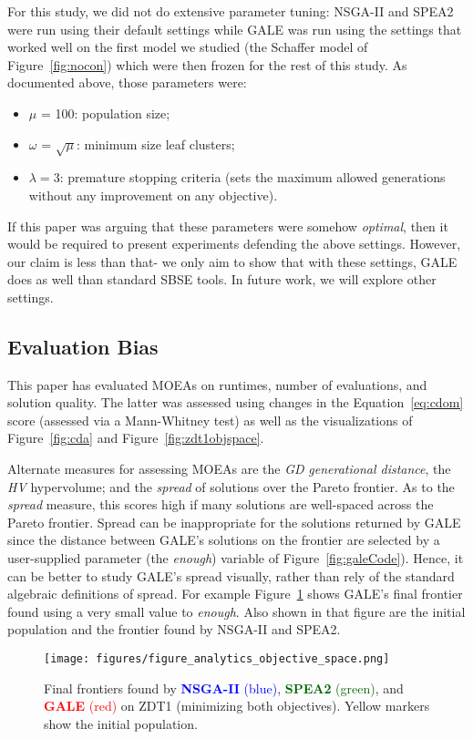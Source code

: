 \documentclass[10pt,journal,compsoc]{IEEEtran}
\newcommand{\eq}[1]{Equation~\ref{eq:#1}}
\newcommand{\bi}{\begin{itemize}}
\newcommand{\ei}{\end{itemize}}
\newcommand{\fig}[1]{Figure~\ref{fig:#1}}
\begin{document}
For this study, we did not do extensive parameter tuning:
NSGA-II and SPEA2 were run using their default settings
while GALE was run using the settings that worked well on the first model  we
studied (the Schaffer model of \fig{nocon}) which were then frozen for the
rest of this study. As documented above, those parameters were:
\bi
\item $\mu$ = 100:  population size;
\item $\omega$ = $\sqrt{\mu}$: minimum size leaf clusters;
\item $\lambda = 3$: premature stopping criteria (sets the
maximum allowed 
generations without
any improvement on any objective).
\ei
If this paper was arguing that these parameters were somehow {\em optimal},
then it would be required to present experiments defending the above settings.
However, our  claim is less than that- we only aim  to show
that with these settings, GALE does as well than standard
SBSE tools. In future work, we will explore other  settings.

\subsection{Evaluation Bias}
This paper has evaluated MOEAs on runtimes,
number of evaluations,
and solution quality. The latter was assessed
using changes in the \eq{cdom} score (assessed via a Mann-Whitney
test) as well as the visualizations of \fig{cda}
and \fig{zdt1objspace}.






Alternate measures for assessing MOEAs are the
{\em GD}
{\em generational distance}, 
the {\em HV} hypervolume;
and
the {\em spread} of solutions over the Pareto frontier.
As to the {\em spread} measure, this scores high if
many solutions are well-spaced across the Pareto
frontier. Spread can be inappropriate for the
solutions returned by GALE since the distance
between GALE's solutions on the frontier are
selected by a user-supplied parameter (the {\em
enough}) variable of \fig{galeCode}).  Hence, it can
be better to study GALE's spread visually, rather
than rely of the standard algebraic definitions of
spread.  For example \fig{golspread} shows GALE's
final frontier found using a very small value to
{\em enough}. Also shown in that figure are the
initial population and the frontier found by NSGA-II
and SPEA2.  

\begin{figure}[!b]
\texttt{[image: figures/figure\_analytics\_objective\_space.png]}
\caption{Final frontiers found by 
\textcolor{blue}{{\bf NSGA-II} (blue)}, \textcolor{darkgreen}{{\bf SPEA2} (green)}, and \textcolor{red}{{\bf GALE} (red)} on ZDT1 (minimizing both objectives).  Yellow markers show the initial population.}\label{fig:golspread}
\end{figure}
\end{document}
